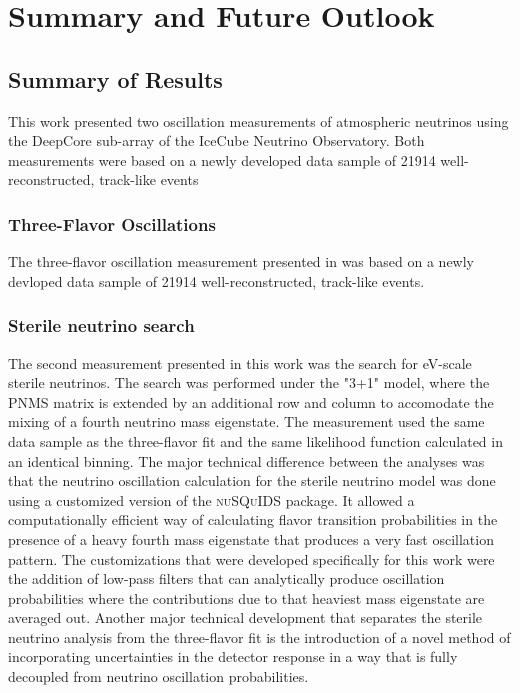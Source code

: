 \setchapterpreamble[u]{\margintoc}
\chapter{Summary and Future Outlook}

\section{Summary of Results}
\label{sec:summary}

This work presented two oscillation measurements of atmospheric neutrinos using the DeepCore sub-array of the IceCube Neutrino Observatory. Both measurements were based on a newly developed data sample of \num{21914} well-reconstructed, track-like events

\subsection{Three-Flavor Oscillations}
\label{sec:summary-three-flavor}

The three-flavor oscillation measurement presented in  was based on a newly devloped data sample of \num{21914} well-reconstructed, track-like events.

\subsection{Sterile neutrino search}
The second measurement presented in this work was the search for eV-scale sterile neutrinos. The search was performed under the "3+1" model, where the PNMS matrix is extended by an additional row and column to accomodate the mixing of a fourth neutrino mass eigenstate. The measurement used the same data sample as the three-flavor fit and the same likelihood function calculated in an identical binning. The major technical difference between the analyses was that the neutrino oscillation calculation for the sterile neutrino model was done using a customized version of the \textsc{nuSQuIDS} package. It allowed a computationally efficient way of calculating flavor transition probabilities in the presence of a heavy fourth mass eigenstate that produces a very fast oscillation pattern. The customizations that were developed specifically for this work were the addition of low-pass filters that can analytically produce oscillation probabilities where the contributions due to that heaviest mass eigenstate are averaged out. Another major technical development that separates the sterile neutrino analysis from the three-flavor fit is the introduction of a novel method of incorporating uncertainties in the detector response in a way that is fully decoupled from neutrino oscillation probabilities.

